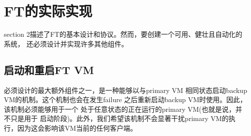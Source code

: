 \section{FT的实际实现}

section 2描述了FT的基本设计和协议。然而，要创建一个可用、健壮且自动化的系统，%
还必须设计并实现许多其他组件。

\subsection{启动和重启FT VM}

必须设计的最大额外组件之一，是一种能够以与primary VM%
相同状态启动backup VM的机制。这个机制也会在发生failure%
之后重新启动backup VM时使用。因此，该机制必须能够用于一个%
处于任意状态的正在运行的primary VM(也就是说，并不只是用于%
启动阶段)。此外，我们希望该机制不会显著干扰primary VM的执%
行，因为这会影响该VM当前的任何客户端。%

